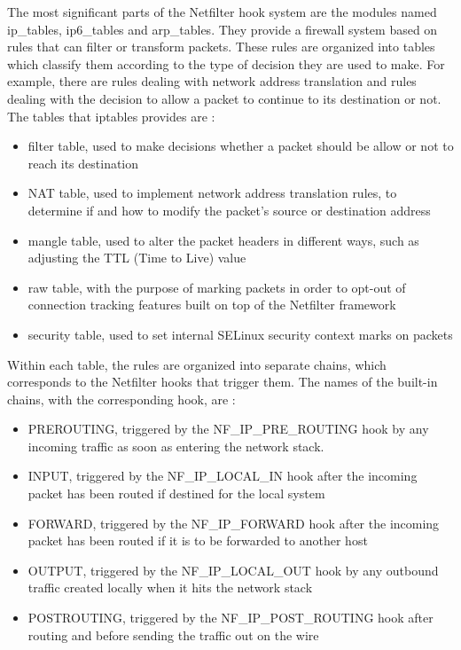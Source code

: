 The most significant parts of the Netfilter hook system are the modules named ip\_tables, ip6\_tables and arp\_tables. They provide a firewall system based on rules that can filter or transform packets. These rules are organized into tables which classify them according to the type of decision they are used to make. For example, there are rules dealing with network address translation and rules dealing with the decision to allow a packet to continue to its destination or not. The tables that iptables provides are \citep{ellingwood2015iptables}:

\begin{itemize}
\item filter table, used to make decisions whether a packet should be allow or not to reach its destination
\item NAT table, used to implement network address translation rules, to determine if and how to modify the packet's source or destination address
\item mangle table, used to alter the packet headers in different ways, such as adjusting the TTL (Time to Live) value
\item raw table, with the purpose of marking packets in order to opt-out of connection tracking features built on top of the Netfilter framework
\item security table, used to set internal SELinux security context marks on packets
\end{itemize}

Within each table, the rules are organized into separate chains, which corresponds to the Netfilter hooks that trigger them. The names of the built-in chains, with the corresponding hook, are \citep{ellingwood2015iptables}:

\begin{itemize}
\item PREROUTING, triggered by the NF\_IP\_PRE\_ROUTING hook by any incoming traffic as soon as entering the network stack.
\item INPUT, triggered by the NF\_IP\_LOCAL\_IN hook after the incoming packet has been routed if destined for the local system
\item FORWARD, triggered by the NF\_IP\_FORWARD hook after the incoming packet has been routed if it is to be forwarded to another host
\item OUTPUT, triggered by the NF\_IP\_LOCAL\_OUT hook by any outbound traffic created locally when it hits the network stack
\item POSTROUTING, triggered by the NF\_IP\_POST\_ROUTING hook after routing and before sending the traffic out on the wire
\end{itemize}

